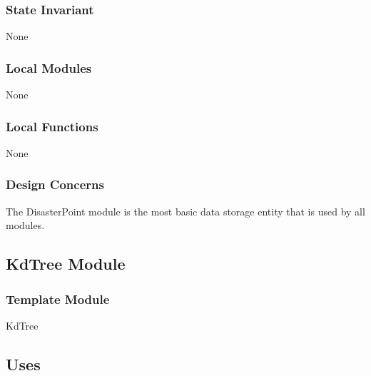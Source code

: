 \documentclass[12pt]{article}
\begin{document}
                \subsubsection* {State Invariant}
                
                None
                
                \subsubsection* {Local Modules}
                
                None
                
                \subsubsection* {Local Functions}
                
                None
                
                \subsubsection* {Design Concerns}
                
                The DisasterPoint module is the most basic data storage entity that is used
                by all modules.
                
                \newpage
                \subsection* {KdTree Module}
                
                \subsubsection*{Template Module}
                
                KdTree
                
                \subsection* {Uses}
                
\end{document}
